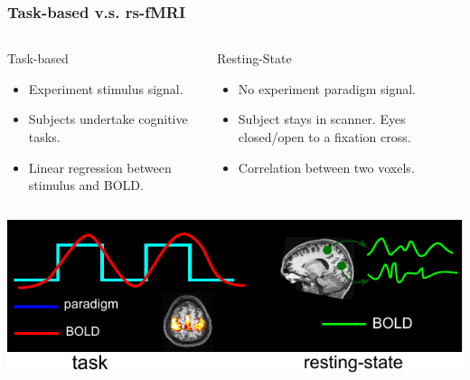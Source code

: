 \documentclass[sansserif, 10pt]{beamer}
\begin{document}
\begin{frame}
  \frametitle{Task-based v.s. rs-fMRI}
  \begin{columns}[t]
    \begin{column}{5cm}
      \begin{block}{Task-based}
        \begin{itemize}
        \item Experiment stimulus signal.
        \item Subjects undertake cognitive tasks.
        \item Linear regression between stimulus and BOLD.
        \end{itemize}
      \end{block}

    \end{column}

    \begin{column}{5cm}
      \begin{block}{Resting-State}
        \begin{itemize}
        \item No experiment paradigm signal.
        \item Subject stays in scanner. Eyes closed/open to a fixation cross.
        \item Correlation between two voxels.
        \end{itemize}
      \end{block}
    \end{column}
  \end{columns}
  \vspace{5pt}
  \includegraphics[width=1\textwidth]{sfig/task_rest}
\end{frame}
\end{document}
